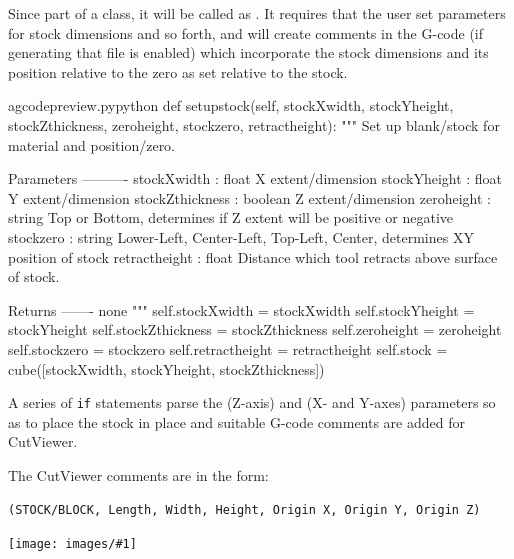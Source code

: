 \documentclass{ltxdoc}
\newcommand{\includeimage}[1]{\bigskip\noindent\texttt{[image: images/\#1]}\bigskip}
\begin{document}
Since part of a class, it will be called as . It requires that the user set parameters for stock dimensions and so forth, and will create comments in the G-code (if generating that file is enabled) which incorporate the stock dimensions and its position relative to the zero as set relative to the stock.

\lstset{firstnumber=\thegcpy}
\begin{writecode}{a}{gcodepreview.py}{python}
    def setupstock(self, stockXwidth,
                 stockYheight,
                 stockZthickness,
                 zeroheight,
                 stockzero,
                 retractheight):
        """
        Set up blank/stock for material and position/zero.
        
        Parameters
        ----------
        stockXwidth :   float
                        X extent/dimension
        stockYheight :  float
                        Y extent/dimension
        stockZthickness : boolean
                        Z extent/dimension
        zeroheight :    string
                        Top or Bottom, determines if Z extent will be positive or negative
        stockzero :     string
                        Lower-Left, Center-Left, Top-Left, Center, determines XY position of stock 
        retractheight : float
                        Distance which tool retracts above surface of stock.
        
        Returns
        -------
        none
        """
        self.stockXwidth = stockXwidth
        self.stockYheight = stockYheight
        self.stockZthickness = stockZthickness
        self.zeroheight = zeroheight
        self.stockzero = stockzero
        self.retractheight = retractheight 
        self.stock = cube([stockXwidth, stockYheight, stockZthickness]) 

\end{writecode}
\addtocounter{gcpy}{36}

A series of \verb|if| statements parse the  (Z-axis) and  (X- and Y-axes) parameters so as to place the stock in place and suitable G-code comments are added for CutViewer.

The CutViewer comments are in the form:

\begin{verbatim}
(STOCK/BLOCK, Length, Width, Height, Origin X, Origin Y, Origin Z)
\end{verbatim}

\includeimage{cutviewer_stocksize.png}
\end{document}

